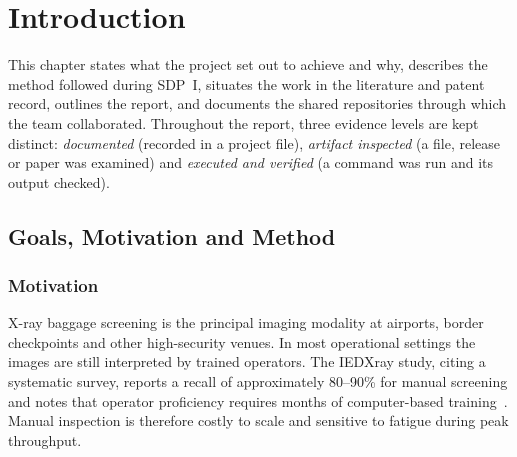 \chapter{Introduction}
\label{ch:introduction}

This chapter states what the project set out to achieve and why, describes the
method followed during SDP~I, situates the work in the literature and patent
record, outlines the report, and documents the shared repositories through which
the team collaborated. Throughout the report, three evidence levels are kept
distinct: \emph{documented} (recorded in a project file), \emph{artifact inspected}
(a file, release or paper was examined) and \emph{executed and verified} (a command
was run and its output checked).

\section{Goals, Motivation and Method}
\label{sec:goals}

\subsection{Motivation}
X-ray baggage screening is the principal imaging modality at airports, border
checkpoints and other high-security venues. In most operational settings the
images are still interpreted by trained operators. The IEDXray study, citing a
systematic survey, reports a recall of approximately 80--90\% for manual
screening and notes that operator proficiency requires months of computer-based
training~\citep{takele2026iedxray,velayudhan2023survey}. Manual inspection is
therefore costly to scale and sensitive to fatigue during peak throughput.

